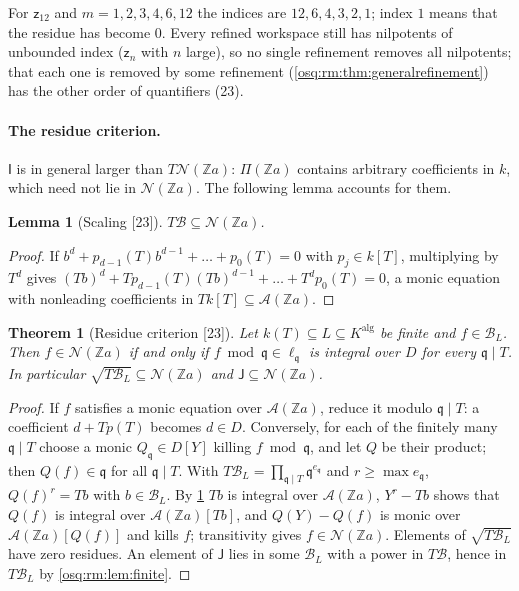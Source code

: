 \documentclass[11pt,letterpaper]{article}
\numberwithin{equation}{section}
\newtheorem{theorem}{Theorem}[section]
\newtheorem{lemma}[lemma]{Lemma}
\theoremstyle{definition}
\theoremstyle{remark}
\theoremstyle{plain}
\newcommand{\Z}{\mathbb Z}
\newcommand{\A}{\mathcal A}          %
\newcommand{\NN}{\mathcal N}         %
\newcommand{\src}[1]{\textup{\textsf{[#1]}}}
\begin{document}
For $\mathsf z_{12}$ and $m=1,2,3,4,6,12$ the indices are $12,6,4,3,2,1$; index $1$ means that the residue has become $0$. Every refined workspace still
has nilpotents of unbounded index ($\mathsf z_n$ with $n$ large), so no single refinement removes all nilpotents; that each one is removed by some
refinement (\cref{osq:rm:thm:generalrefinement}) has the other order of quantifiers (23).

\paragraph{The residue criterion.} $\mathsf I$ is in general larger than $T\NN(\Z a)$: $\Pi(\Z a)$ contains arbitrary coefficients in $k$, which need not
lie in $\NN(\Z a)$. The following lemma accounts for them.

\begin{lemma}[Scaling \src{23}]\label{osq:rm:lem:scaling}
$T\mathscr B\subseteq\NN(\Z a)$.
\end{lemma}
\begin{proof}
If $b^d+p_{d-1}(T)b^{d-1}+\dots+p_0(T)=0$ with $p_j\in k[T]$, multiplying by $T^d$ gives
$(Tb)^d+Tp_{d-1}(T)(Tb)^{d-1}+\dots+T^dp_0(T)=0$, a monic equation with nonleading coefficients in $Tk[T]\subseteq\A(\Z a)$.
\end{proof}

\begin{theorem}[Residue criterion \src{23}]\label{osq:rm:thm:residues}
Let $k(T)\subseteq L\subseteq K^{\mathrm{alg}}$ be finite and $f\in\mathscr B_L$. Then $f\in\NN(\Z a)$ if and only if $f\bmod\mathfrak q\in\ell_{\mathfrak q}$ is
integral over $D$ for every $\mathfrak q\mid T$. In particular $\sqrt{T\mathscr B_L}\subseteq\NN(\Z a)$ and $\mathsf J\subseteq\NN(\Z a)$.
\end{theorem}
\begin{proof}
If $f$ satisfies a monic equation over $\A(\Z a)$, reduce it modulo $\mathfrak q\mid T$: a coefficient $d+Tp(T)$ becomes $d\in D$. Conversely, for each of
the finitely many $\mathfrak q\mid T$ choose a monic $Q_{\mathfrak q}\in D[Y]$ killing $f\bmod\mathfrak q$, and let $Q$ be their product; then $Q(f)\in\mathfrak q$
for all $\mathfrak q\mid T$. With $T\mathscr B_L=\prod_{\mathfrak q\mid T}\mathfrak q^{e_{\mathfrak q}}$ and $r\ge\max e_{\mathfrak q}$, $Q(f)^r=Tb$ with
$b\in\mathscr B_L$. By \cref{osq:rm:lem:scaling} $Tb$ is integral over $\A(\Z a)$, $Y^r-Tb$ shows that $Q(f)$ is integral over $\A(\Z a)[Tb]$, and
$Q(Y)-Q(f)$ is monic over $\A(\Z a)[Q(f)]$ and kills $f$; transitivity gives $f\in\NN(\Z a)$. Elements of $\sqrt{T\mathscr B_L}$ have zero residues. An
element of $\mathsf J$ lies in some $\mathscr B_L$ with a power in $T\mathscr B$, hence in $T\mathscr B_L$ by \cref{osq:rm:lem:finite}.
\end{proof}
\end{document}
